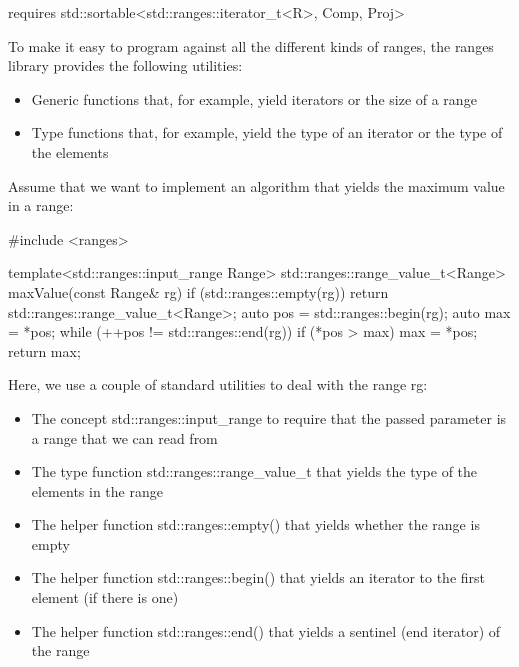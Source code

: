 \begin{cpp}
requires std::sortable<std::ranges::iterator_t<R>, Comp, Proj>
\end{cpp}


To make it easy to program against all the different kinds of ranges, the ranges library provides the following utilities:

\begin{itemize}
\item
Generic functions that, for example, yield iterators or the size of a range

\item
Type functions that, for example, yield the type of an iterator or the type of the elements
\end{itemize}

Assume that we want to implement an algorithm that yields the maximum value in a range:


\begin{cpp}
#include <ranges>

template<std::ranges::input_range Range>
std::ranges::range_value_t<Range> maxValue(const Range& rg)
{
	if (std::ranges::empty(rg)) {
		return std::ranges::range_value_t<Range>{};
	}
	auto pos = std::ranges::begin(rg);
	auto max = *pos;
	while (++pos != std::ranges::end(rg)) {
		if (*pos > max) {
			max = *pos;
		}
	}
	return max;
}
\end{cpp}

Here, we use a couple of standard utilities to deal with the range rg:

\begin{itemize}
\item
The concept std::ranges::input\_range to require that the passed parameter is a range that we can read from

\item
The type function std::ranges::range\_value\_t that yields the type of the elements in the range

\item
The helper function std::ranges::empty() that yields whether the range is empty

\item
The helper function std::ranges::begin() that yields an iterator to the first element (if there is one)

\item
The helper function std::ranges::end() that yields a sentinel (end iterator) of the range
\end{itemize}


